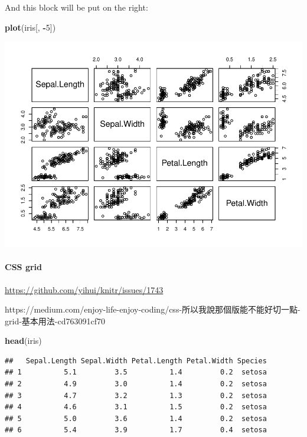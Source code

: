 \documentclass[
]{book}
\newenvironment{Shaded}{\begin{snugshade}}{\end{snugshade}}
\newcommand{\DecValTok}[1]{\textcolor[rgb]{0.00,0.00,0.81}{#1}}
\newcommand{\FunctionTok}[1]{\textcolor[rgb]{0.13,0.29,0.53}{\textbf{#1}}}
\newcommand{\NormalTok}[1]{#1}
\newcommand{\SpecialCharTok}[1]{\textcolor[rgb]{0.81,0.36,0.00}{\textbf{#1}}}
\theoremstyle{definition}
\theoremstyle{definition}
\theoremstyle{definition}
\theoremstyle{definition}
\theoremstyle{remark}
\begin{document}
And this block will be put on the right:

\begin{Shaded}
\begin{Highlighting}[]
\FunctionTok{plot}\NormalTok{(iris[, }\SpecialCharTok{{-}}\DecValTok{5}\NormalTok{])}
\end{Highlighting}
\end{Shaded}

\includegraphics{202401280001-test_files/figure-latex/unnamed-chunk-39-1.pdf}

\paragraph{CSS grid}\label{css-grid}

\url{https://github.com/yihui/knitr/issues/1743}

\begin{CJK}{UTF8}{bsmi}
https://medium.com/enjoy-life-enjoy-coding/css-所以我說那個版能不能好切一點-grid-基本用法-cd763091cf70
\end{CJK}

\begin{Shaded}
\begin{Highlighting}[]
\FunctionTok{head}\NormalTok{(iris)}
\end{Highlighting}
\end{Shaded}

\begin{verbatim}
##   Sepal.Length Sepal.Width Petal.Length Petal.Width Species
## 1          5.1         3.5          1.4         0.2  setosa
## 2          4.9         3.0          1.4         0.2  setosa
## 3          4.7         3.2          1.3         0.2  setosa
## 4          4.6         3.1          1.5         0.2  setosa
## 5          5.0         3.6          1.4         0.2  setosa
## 6          5.4         3.9          1.7         0.4  setosa
\end{verbatim}
\end{document}
